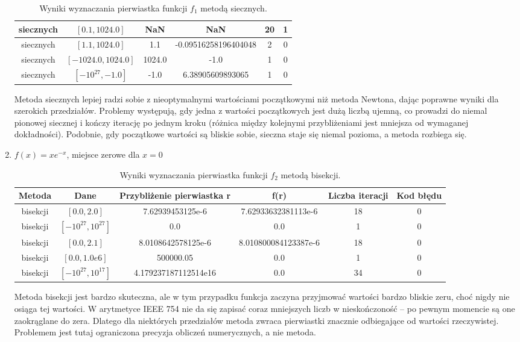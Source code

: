 \documentclass{article}
\begin{document}
\begin{enumerate}[label=(\alph*)]
\begin{table}[H]
\begin{tabular}{|c|c||c|c|c|c|}
        \hline
        siecznych & $[0.1, 1024.0]$ & NaN & NaN & 20 & 1 \\
        \hline
        siecznych & $[1.1, 1024.0]$ & 1.1 & -0.09516258196404048 & 2 & 0 \\
        \hline
        siecznych & $[-1024.0, 1024.0]$ & 1024.0 & -1.0 & 1 & 0 \\
        \hline
        siecznych & $[-10^{27}, -1.0]$ & -1.0 & 6.38905609893065 & 1 & 0\\
        \hline
    \end{tabular}
    \caption{Wyniki wyznaczania pierwiastka funkcji $f_1$ metodą siecznych.}
\end{table}
Metoda siecznych lepiej radzi sobie z nieoptymalnymi wartościami początkowymi niż metoda Newtona, dając poprawne wyniki dla szerokich przedziałów. Problemy występują, gdy jedna z wartości początkowych jest dużą liczbą ujemną, co prowadzi do niemal pionowej siecznej i kończy iterację po jednym kroku (różnica między kolejnymi przybliżeniami jest mniejsza od wymaganej dokładności). Podobnie, gdy początkowe wartości są bliskie sobie, sieczna staje się niemal pozioma, a metoda rozbiega się.
    \item $f(x) = x e^{-x}$, miejsce zerowe dla $x = 0$
    \begin{table}[H]
    \centering
    \begin{tabular}{|c|c||c|c|c|c|}
        \hline
        Metoda & Dane & Przybliżenie pierwiastka r & f(r) & Liczba iteracji & Kod błędu\\
        \hline
        \hline
        bisekcji & $[0.0, 2.0]$ & 7.62939453125e-6 & 7.62933632381113e-6 & 18 & 0 \\
        \hline
        bisekcji & $[-10^{27}, 10^{27}]$ &0.0 & 0.0 & 1 & 0 \\
        \hline
        bisekcji & $[0.0, 2.1]$ &8.0108642578125e-6 & 8.010800084123387e-6 & 18 & 0\\
        \hline
        bisekcji & $[0.0, 1.0e6]$ & 500000.05 & 0.0 & 1 & 0\\
        \hline
                bisekcji & $[-10^{27}, 10^{17}]$ & 4.179237187112514e16 & 0.0 & 34 & 0\\
        \hline
    \end{tabular}
    \caption{Wyniki wyznaczania pierwiastka funkcji $f_2$ metodą bisekcji.}
\end{table}
Metoda bisekcji jest bardzo skuteczna, ale w tym przypadku funkcja zaczyna przyjmować wartości bardzo bliskie zeru, choć nigdy nie osiąga tej wartości. W arytmetyce IEEE 754 nie da się zapisać coraz mniejszych liczb w nieskończoność – po pewnym momencie są one zaokrąglane do zera. Dlatego dla niektórych przedziałów metoda zwraca pierwiastki znacznie odbiegające od wartości rzeczywistej. Problemem jest tutaj ograniczona precyzja obliczeń numerycznych, a nie metoda.

\end{enumerate}
\end{document}
